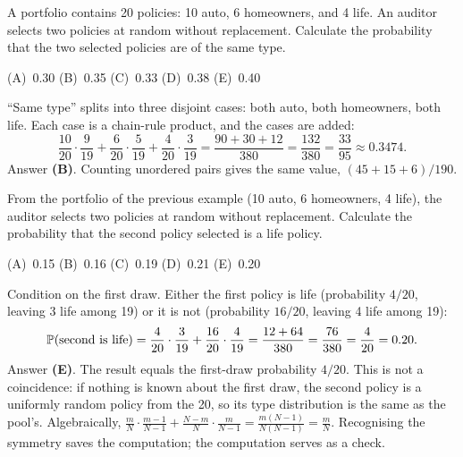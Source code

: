 \begin{example}
A portfolio contains 20 policies: 10 auto, 6 homeowners, and 4 life. An auditor selects two
policies at random without replacement.
Calculate the probability that the two selected policies are of the same type.
\par\smallskip\noindent (A)~0.30 \quad (B)~0.35 \quad (C)~0.33 \quad (D)~0.38 \quad (E)~0.40
\end{example}
\begin{solution}
``Same type'' splits into three disjoint cases: both auto, both homeowners, both life. Each case
is a chain-rule product, and the cases are added:
\[
\frac{10}{20}\cdot\frac{9}{19} + \frac{6}{20}\cdot\frac{5}{19} + \frac{4}{20}\cdot\frac{3}{19}
 = \frac{90 + 30 + 12}{380} = \frac{132}{380} = \frac{33}{95} \approx 0.3474.
\]
Answer \textbf{(B)}. Counting unordered pairs gives the same value, $(45 + 15 + 6)/190$.
\end{solution}

\begin{example}
From the portfolio of the previous example (10 auto, 6 homeowners, 4 life), the auditor selects two
policies at random without replacement.
Calculate the probability that the second policy selected is a life policy.
\par\smallskip\noindent (A)~0.15 \quad (B)~0.16 \quad (C)~0.19 \quad (D)~0.21 \quad (E)~0.20
\end{example}
\begin{solution}
Condition on the first draw. Either the first policy is life (probability $4/20$, leaving 3 life
among 19) or it is not (probability $16/20$, leaving 4 life among 19):
\[
\mathbb{P}(\text{second is life}) = \frac{4}{20}\cdot\frac{3}{19} + \frac{16}{20}\cdot\frac{4}{19}
 = \frac{12 + 64}{380} = \frac{76}{380} = \frac{4}{20} = 0.20.
\]
Answer \textbf{(E)}. The result equals the first-draw probability $4/20$. This is not a coincidence:
if nothing is known about the first draw, the second policy is a uniformly random policy from the
20, so its type distribution is the same as the pool's. Algebraically,
$\frac{m}{N}\cdot\frac{m-1}{N-1} + \frac{N-m}{N}\cdot\frac{m}{N-1} = \frac{m(N-1)}{N(N-1)} = \frac{m}{N}$.
Recognising the symmetry saves the computation; the computation serves as a check.
\end{solution}

